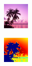 \begin{figure}
\centering
    \centering
    \begin{subfigure}{0.31\textwidth}
        \includegraphics[width=\textwidth]{RegDream.png}
    \end{subfigure}
    \hspace*{\fill}
    \begin{subfigure}{0.31\textwidth}
        \includegraphics[width=\textwidth]{NegDream.png}

\end{subfigure}
\end{figure}
